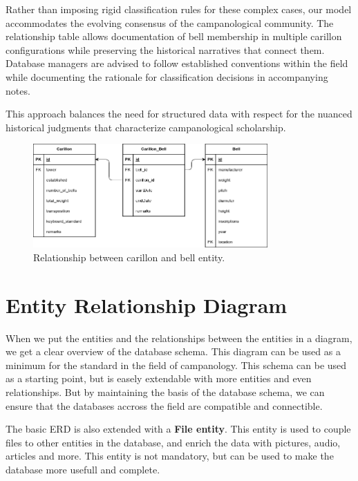 \documentclass[11pt, a4paper]{article}
\begin{document}
Rather than imposing rigid classification rules for these complex cases, our model accommodates the evolving consensus of the campanological community. The relationship table allows documentation of bell membership in multiple carillon configurations while preserving the historical narratives that connect them. Database managers are advised to follow established conventions within the field while documenting the rationale for classification decisions in accompanying notes.

This approach balances the need for structured data with respect for the nuanced historical judgments that characterize campanological scholarship.

\begin{figure}[h!]
    \centering
    \includegraphics[width=0.8\textwidth]{images/carillon_bell.png}
    \caption{Relationship between carillon and bell entity.}
    \label{fig:carillon_bell-relation}
\end{figure}

\section{Entity Relationship Diagram}

When we put the entities and the relationships between the entities in a diagram, we get a clear overview of the database schema. This diagram can be used as a minimum for the standard in the field of campanology. This schema can be used as a starting point, but is easely extendable with more entities and even relationships. But by maintaining the basis of the database schema, we can ensure that the databases accross the field are compatible and connectible. 

The basic ERD is also extended with a \textbf{File entity}. This entity is used to couple files to other entities in the database, and enrich the data with pictures, audio, articles and more. This entity is not mandatory, but can be used to make the database more usefull and complete.
\end{document}
